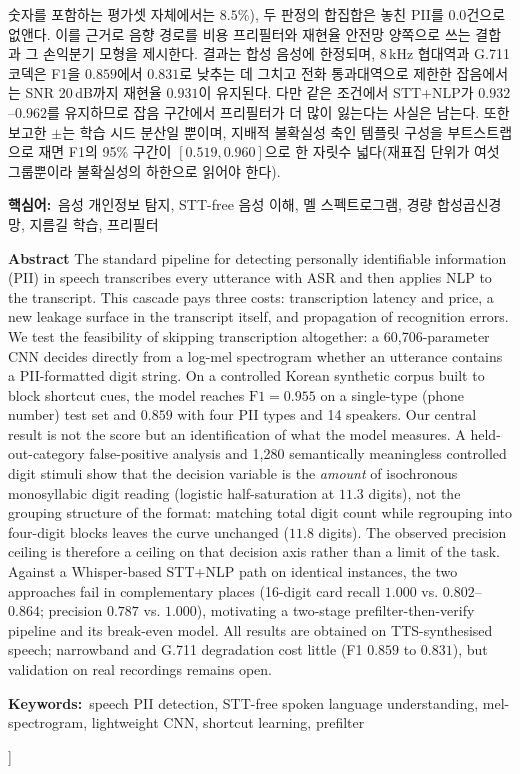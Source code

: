 \documentclass[10pt,twocolumn]{article}
\begin{document}
\begin{center}
\begin{minipage}{0.9\textwidth}
숫자를 포함하는 평가셋 자체에서는 $8.5\%$), 두 판정의 합집합은 놓친 PII를 $0.0$건으로 없앤다. 이를 근거로 음향 경로를
비용 프리필터와 재현율 안전망 양쪽으로 쓰는 결합과 그 손익분기 모형을 제시한다. 결과는 합성 음성에 한정되며, 8\,kHz 협대역과 G.711 코덱은 F1을 $0.859$에서
$0.831$로 낮추는 데 그치고 전화 통과대역으로 제한한 잡음에서는 SNR 20\,dB까지 재현율
$0.931$이 유지된다. 다만 같은 조건에서 STT+NLP가 $0.932$--$0.962$를 유지하므로 잡음 구간에서
프리필터가 더 많이 잃는다는 사실은 남는다. 또한 보고한 $\pm$는 학습 시드 분산일 뿐이며, 지배적 불확실성 축인 템플릿
구성을 부트스트랩으로 재면 F1의 95\% 구간이 {$[0.519, 0.960]$}으로 한 자릿수 넓다(재표집 단위가
여섯 그룹뿐이라 불확실성의 하한으로 읽어야 한다).

\vspace{2mm}
\noindent\textbf{핵심어:}\ 음성 개인정보 탐지, STT-free 음성 이해, 멜 스펙트로그램,
경량 합성곱신경망, 지름길 학습, 프리필터

\vspace{3mm}
\noindent\textbf{Abstract}\quad
The standard pipeline for detecting personally identifiable information (PII) in speech
transcribes every utterance with ASR and then applies NLP to the transcript. This cascade
pays three costs: transcription latency and price, a new leakage surface in the transcript
itself, and propagation of recognition errors. We test the feasibility of skipping
transcription altogether: a 60{,}706-parameter CNN decides directly from a log-mel
spectrogram whether an utterance contains a PII-formatted digit string. On a controlled
Korean synthetic corpus built to block shortcut cues, the model reaches $\text{F1}=0.955$ on
a single-type (phone number) test set and $0.859$ with four PII types and 14 speakers. Our
central result is not the score but an identification of what the model measures. A
held-out-category false-positive analysis and 1{,}280 semantically meaningless controlled
digit stimuli show that the decision variable is the \textit{amount} of isochronous
monosyllabic digit reading (logistic half-saturation at $11.3$ digits), not the grouping
structure of the format: matching total digit count while regrouping into
four-digit blocks leaves the curve unchanged ($11.8$ digits). The observed precision ceiling
is therefore a ceiling on that decision axis rather than a limit of the task. Against a
Whisper-based STT+NLP path on identical instances, the two approaches fail in complementary
places (16-digit card recall $1.000$ vs. $0.802$--$0.864$; precision $0.787$ vs. $1.000$),
motivating a two-stage prefilter-then-verify pipeline and its break-even model. All results are
obtained on TTS-synthesised speech; narrowband and G.711 degradation cost little (F1 $0.859$ to
$0.831$), but validation on real recordings remains open.

\vspace{2mm}
\noindent\textbf{Keywords:}\ speech PII detection, STT-free spoken language understanding,
mel-spectrogram, lightweight CNN, shortcut learning, prefilter
\end{minipage}
\end{center}
\vspace{4mm}
]
\end{document}
